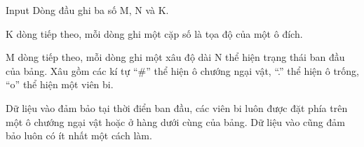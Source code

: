 Input
Dòng đầu ghi ba số M, N và K.

K dòng tiếp theo, mỗi dòng ghi một cặp số là tọa độ của một ô đích.

M dòng tiếp theo, mỗi dòng ghi một xâu độ dài N thể hiện trạng thái ban đầu của bảng. Xâu gồm các kí tự “\#” thể hiện ô chướng ngại vật, “.” thể hiện ô trống, “o” thể hiện một viên bi.

Dữ liệu vào đảm bảo tại thời điển ban đầu, các viên bi luôn được đặt phía trên một ô chướng ngại vật hoặc ở hàng dưới cùng của bảng. Dữ liệu vào cũng đảm bảo luôn có ít nhất một cách làm.